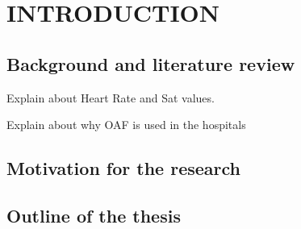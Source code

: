\section{INTRODUCTION} \label{sec:itroduction}

\subsection{Background and literature review}

Explain about Heart Rate and Sat values. 

Explain about why OAF is used in the hospitals


\subsection{Motivation for the research}



\subsection{Outline of the thesis}


